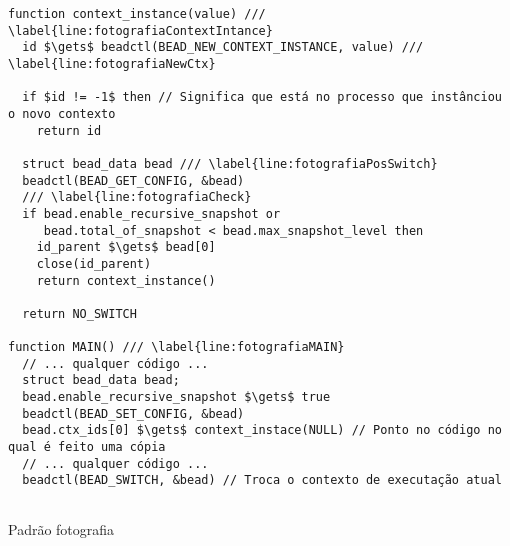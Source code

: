\begin{pseudocode}
\begin{lstlisting}[language=pseudocode, style=pseudocode]
function context_instance(value) /// \label{line:fotografiaContextIntance}
  id $\gets$ beadctl(BEAD_NEW_CONTEXT_INSTANCE, value) /// \label{line:fotografiaNewCtx}

  if $id != -1$ then // Significa que está no processo que instânciou o novo contexto
    return id

  struct bead_data bead /// \label{line:fotografiaPosSwitch}
  beadctl(BEAD_GET_CONFIG, &bead)
  /// \label{line:fotografiaCheck}
  if bead.enable_recursive_snapshot or
     bead.total_of_snapshot < bead.max_snapshot_level then
    id_parent $\gets$ bead[0]
    close(id_parent)
    return context_instance()

  return NO_SWITCH

function MAIN() /// \label{line:fotografiaMAIN}
  // ... qualquer código ...
  struct bead_data bead;
  bead.enable_recursive_snapshot $\gets$ true
  beadctl(BEAD_SET_CONFIG, &bead)
  bead.ctx_ids[0] $\gets$ context_instace(NULL) // Ponto no código no qual é feito uma cópia
  // ... qualquer código ...
  beadctl(BEAD_SWITCH, &bead) // Troca o contexto de executação atual
  
\end{lstlisting}

  \caption{Padrão fotografia}
  \label{alg:fotografia}
\end{pseudocode}
